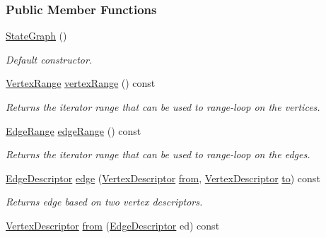 \subsubsection*{Public Member Functions}
\begin{DoxyCompactItemize}
\item 
\hyperlink{structStateGraph_a0d4c8d36bdd8d19dc35fabe85a620e73}{State\+Graph} ()\hypertarget{structStateGraph_a0d4c8d36bdd8d19dc35fabe85a620e73}{}\label{structStateGraph_a0d4c8d36bdd8d19dc35fabe85a620e73}

\begin{DoxyCompactList}\small\item\em Default constructor. \end{DoxyCompactList}\item 
\hyperlink{structStateGraph_a5e6fb41e87c50e83293769a58ae714a8}{Vertex\+Range} \hyperlink{structStateGraph_a2450ee54ecacceb7be287edca1257ff8}{vertex\+Range} () const 
\begin{DoxyCompactList}\small\item\em Returns the iterator range that can be used to range-\/loop on the vertices. \end{DoxyCompactList}\item 
\hyperlink{structStateGraph_a8ce3f68a1838d6dd8ce4182876e73fbe}{Edge\+Range} \hyperlink{structStateGraph_a412c99b60c8233f4163e80b0b08ff28f}{edge\+Range} () const 
\begin{DoxyCompactList}\small\item\em Returns the iterator range that can be used to range-\/loop on the edges. \end{DoxyCompactList}\item 
\hyperlink{structStateGraph_a419a555605bf486301b84dd6055d81f2}{Edge\+Descriptor} \hyperlink{structStateGraph_a2177ef2874962bd9e0c44b0cdd495081}{edge} (\hyperlink{structStateGraph_a95d7ea26b0d0d07d3488068a8e9be53c}{Vertex\+Descriptor} \hyperlink{structStateGraph_adedd93d0dea76929eaec98633c535d26}{from}, \hyperlink{structStateGraph_a95d7ea26b0d0d07d3488068a8e9be53c}{Vertex\+Descriptor} \hyperlink{structStateGraph_a559e914bb1d10df20ab62be4ce667221}{to}) const 
\begin{DoxyCompactList}\small\item\em Returns edge based on two vertex descriptors. \end{DoxyCompactList}\item 
\hyperlink{structStateGraph_a95d7ea26b0d0d07d3488068a8e9be53c}{Vertex\+Descriptor} \hyperlink{structStateGraph_adedd93d0dea76929eaec98633c535d26}{from} (\hyperlink{structStateGraph_a419a555605bf486301b84dd6055d81f2}{Edge\+Descriptor} ed) const 

\end{DoxyCompactItemize}
